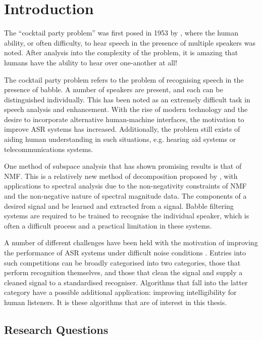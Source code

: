 %

\chapter{Introduction}

\acresetall

The ``cocktail party problem'' was first posed in 1953 by \cite{Cherry1953},
where the human ability, or often difficulty, to hear speech in the
presence of multiple speakers was noted. After analysis into the complexity
of the problem, it is amazing that humans have the ability to hear
over one-another at all!

The cocktail party problem refers to the problem of recognising speech
in the presence of babble. A number of speakers are present, and each
can be distinguished individually. This has been noted as an extremely
difficult task in speech analysis and enhancement. With the rise of
modern technology and the desire to incorporate alternative human-machine
interfaces, the motivation to improve \ac{ASR} systems has increased.
Additionally, the problem still exists of aiding human understanding
in such situations, e.g. hearing aid systems or telecommunications
systems.

One method of subspace analysis that has shown promising results is
that of \ac{NMF}. This is a relatively new method of decomposition
proposed by \cite{Lee1999}, with applications to spectral analysis
due to the non-negativity constraints of \ac{NMF} and the non-negative
nature of spectral magnitude data. The components of a desired signal
and be learned and extracted from a signal. Babble filtering systems
are required to be trained to recognise the individual speaker, which
is often a difficult process and a practical limitation in these systems.

A number of different challenges have been held with the motivation
of improving the performance of \ac{ASR} systems under difficult
noise conditions \cite{Cooke2010,Barker2013,Vincent2013}. Entries
into such competitions can be broadly categorised into two categories,
those that perform recognition themselves, and those that clean the
signal and supply a cleaned signal to a standardised recogniser. Algorithms
that fall into the latter category have a possible additional application:
improving intelligibility for human listeners. It is these algorithms
that are of interest in this thesis.


\section{Research Questions}

